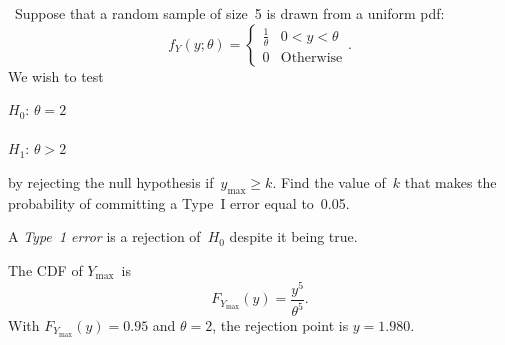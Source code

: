 \begin{problem}
  ~Suppose that a random sample of size~5 is drawn from a uniform pdf:
  \begin{equation}
    f_{Y}(y;\theta) = \begin{cases}
                        \frac{1}{\theta} & 0 < y < \theta \\
                        0 & \text{Otherwise}
                      \end{cases}\text{.}
  \end{equation}
  \noindent
  We wish to test
  \begin{center}
    $H_0$: $\theta = 2$ \\
     \\
    $H_1$: $\theta > 2$ \\
  \end{center}
  \noindent
  by rejecting the null hypothesis if~${y_{\max} \geq k}$. Find the value of~$k$ that makes the probability of committing a Type~I error equal to~0.05.
\end{problem}

A \textit{Type~1 error} is a rejection of~$H_0$ despite it being true.

\noindent
The CDF of $Y_{\max}$~is
\begin{equation*}
  F_{Y_{\max}}(y) = \frac{y^5}{\theta ^5}\text{.}
\end{equation*}
With ${F_{Y_{\max}}(y) = 0.95}$ and ${\theta = 2}$, the rejection point is ${\boxed{y = 1.980}}$.
